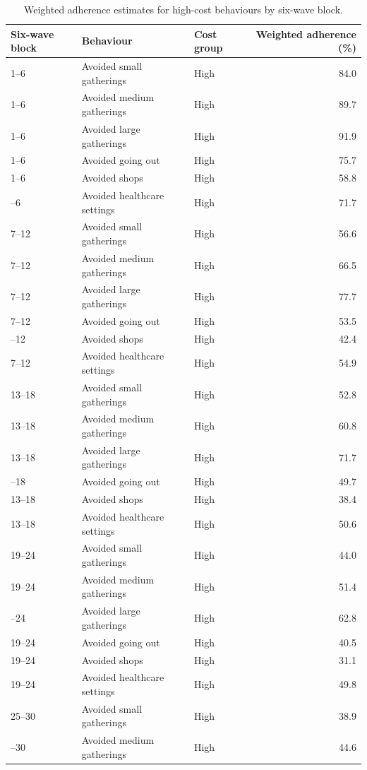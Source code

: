 \documentclass[
  12pt,
  a4paper,
]{article}
\begin{document}
\begin{longtable}[t]{lllr}
\caption{\label{tab:high-trends-appendix}Weighted adherence estimates for high-cost behaviours by six-wave block.}\\
\toprule
Six-wave block & Behaviour & Cost group & Weighted adherence (\%)\\
\midrule
1--6 & Avoided small gatherings & High & 84.0\\
1--6 & Avoided medium gatherings & High & 89.7\\
1--6 & Avoided large gatherings & High & 91.9\\
1--6 & Avoided going out & High & 75.7\\
1--6 & Avoided shops & High & 58.8\\
\addlinespace
1--6 & Avoided healthcare settings & High & 71.7\\
7--12 & Avoided small gatherings & High & 56.6\\
7--12 & Avoided medium gatherings & High & 66.5\\
7--12 & Avoided large gatherings & High & 77.7\\
7--12 & Avoided going out & High & 53.5\\
\addlinespace
7--12 & Avoided shops & High & 42.4\\
7--12 & Avoided healthcare settings & High & 54.9\\
13--18 & Avoided small gatherings & High & 52.8\\
13--18 & Avoided medium gatherings & High & 60.8\\
13--18 & Avoided large gatherings & High & 71.7\\
\addlinespace
13--18 & Avoided going out & High & 49.7\\
13--18 & Avoided shops & High & 38.4\\
13--18 & Avoided healthcare settings & High & 50.6\\
19--24 & Avoided small gatherings & High & 44.0\\
19--24 & Avoided medium gatherings & High & 51.4\\
\addlinespace
19--24 & Avoided large gatherings & High & 62.8\\
19--24 & Avoided going out & High & 40.5\\
19--24 & Avoided shops & High & 31.1\\
19--24 & Avoided healthcare settings & High & 49.8\\
25--30 & Avoided small gatherings & High & 38.9\\
\addlinespace
25--30 & Avoided medium gatherings & High & 44.6\\

\end{longtable}
\end{document}
